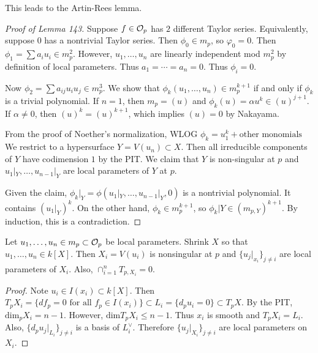 \documentclass[twoside, 10pt]{article}
\begin{document}
    \begin{rmk}
        This leads to the Artin-Rees lemma.
    \end{rmk}

    \begin{proof}[Proof of Lemma 143]
        Suppose $f \in \mathcal{O}_p$ has $2$ different Taylor series. Equivalently, suppose $0$ has a nontrivial Taylor series. Then $\phi_0 \in m_p$, so $\varphi_0 = 0$. Then $\phi_1 = \sum a_i u_i \in m_p^2$. However, $u_1, \ldots, u_n$ are linearly independent mod $m_p^2$ by definition of local parameters. Thus $a_1 = \cdots = a_n = 0$. Thus $\phi_i = 0$.

        Now $\phi_2 = \sum a_{ij}u_iu_j \in m_p^3$. We show that $\phi_k(u_1, \ldots, u_n) \in m_p^{k+1}$ if and only if $\phi_k$ is a trivial polynomial. If $n = 1$, then $m_p = (u)$ and $\phi_k(u) = \alpha u^k \in (u)^{j+1}$. If $\alpha \neq 0$, then $(u)^k = (u)^{k+1}$, which implies $(u) = 0$ by Nakayama.

        From the proof of Noether's normalization, WLOG $\phi_k = u_1^k + \text{other monomials}$ We restrict to a hypersurface $Y = V(u_n) \subset X$. Then all irreducible components of $Y$ have codimension $1$ by the PIT. We claim that $Y$ is non-singular at $p$ and $u_1|_Y, \ldots, u_{n-1}|_Y$ are local parameters of $Y$ at $p$.

        Given the claim, $\phi_k|_Y = \phi(u_1|_Y, \ldots, u_{n-1}|_Y, 0)$ is a nontrivial polynomial. It contains $(u_1|_Y)^k$. On the other hand, $\phi_k \in m_p^{k+1}$, so $\phi_k|Y \in (m_{p,Y})^{k+1}$. By induction, this is a contradiction.
    \end{proof}

    \begin{thm}
        Let $u_1, \ldots, u_n \in m_p \subset \mathcal{O}_p$ be local parameters. Shrink $X$ so that $u_1, \ldots, u_n \in k[X]$. Then $X_i = V(u_i)$ is nonsingular at $p$ and $\{u_j|_{x_i}\}_{j \neq i}$ are local parameters of $X_i$. Also, $\cap_{i=1}^n T_{p,X_i} = 0$.
        \begin{proof}
            Note $u_i \in I(x_i) \subset k[X]$. Then $T_p X_i = \{d f_p = 0 \text{ for all } f_p \in I(x_i) \} \subset L_i = \{ d_p u_i = 0\} \subset T_p X$. By the PIT, $\mathrm{dim}_p X_i = n-1$. However, $\mathrm{dim} T_pX_i \leq n-1$. Thus $x_i$ is smooth and $T_p X_i = L_i$. Also, $\{d_p u_j |_{L_i} \}_{j \neq i}$ is a basis of $L_i^{\vee}$. Therefore $\{u_j|_{X_i}\}_{j \neq i}$ are local parameters on $X_i$.
        \end{proof}
    \end{thm}
\end{document}

